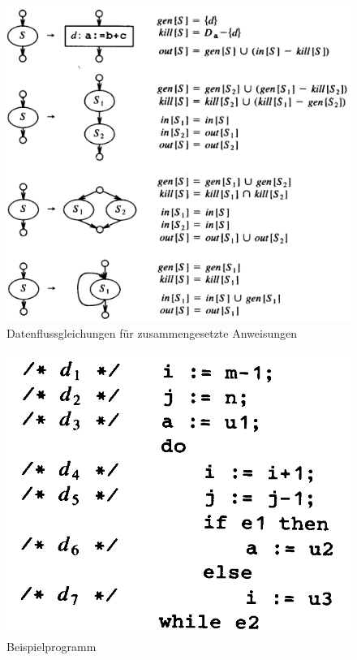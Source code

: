 \begin{figure}[p]
  \centering
  \includegraphics[scale=0.2]{images/bild1-3.png}
  \caption{Datenflussgleichungen für zusammengesetzte Anweisungen}
  \label{fig:datenflussgleichungen}
\end{figure}

\begin{figure}[p]
  \centering
  \includegraphics[scale=0.2]{images/bild3-1.png}
  \caption{Beispielprogramm}
  \label{fig:beispielprogramm}
\end{figure}

